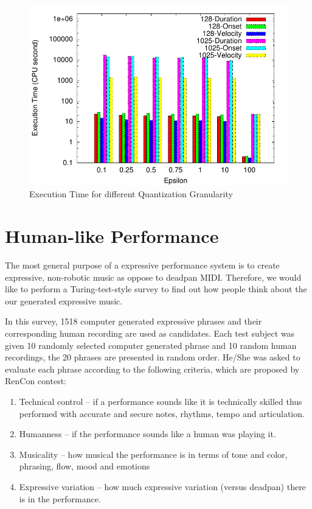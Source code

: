 \begin{figure}[tp]
   \begin{center}
      \includegraphics[width=\textwidth]{fig/quant_comp}
   \end{center}
   \caption{Execution Time for different Quantization Granularity}
   \label{fig:quant_comp}
\end{figure}

\section{Human-like Performance}
\label{sec:turing}
The most general purpose of a expressive performance system is to create expressive, non-robotic music as oppose to deadpan MIDI. Therefore, we would like to perform a Turing-test-style survey to find out how people think about the our generated expressive music.

In this survey, 1518 computer generated expressive phrases and their corresponding human recording are used as candidates. Each test subject was given 10 randomly selected computer generated phrase and 10 random human recordings, the 20 phrases are presented in random order. He/She was asked to evaluate each phrase according to the following criteria, which are proposed by RenCon contest\cite{rencon}:
\begin{enumerate}
   \item Technical control – if a performance sounds like it is technically skilled thus performed with accurate and secure notes, rhythms, tempo and articulation.
   \item  Humanness – if the performance sounds like a human was playing it.
   \item  Musicality – how musical the performance is in terms of tone and color, phrasing, flow, mood and emotions
   \item Expressive variation – how much expressive variation (versus deadpan) there is in the performance.
\end{enumerate}

